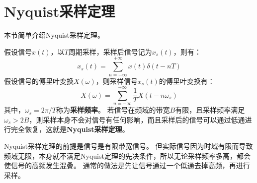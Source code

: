 \section{Nyquist采样定理}

本节简单介绍Nyquist采样定理。

假设信号$x\left( t \right) $，以$T$周期采样，采样后信号记为$x_s\left( t \right) $，则有：
\[
x_s\left( t \right) =\sum_{n=-\infty}^{+\infty}{x\left( t \right) \delta \left( t-nT \right)}
\]
假设信号的傅里叶变换$X\left( \omega \right) $，则采样信号$x_s\left( t \right) $的傅里叶变换有：
\[
X\left( \omega \right) =\sum_{n=-\infty}^{+\infty}{\frac{1}{T}X\left( t-n\omega _s \right)}
\]
其中，$\omega _s=2\pi /T$称为{\bf 采样频率}。
若信号在频域的带宽$B$有限，且采样频率满足$\omega _s>2B$，则采样本身不会对信号有任何影响，而且采样后的信号可以通过低通进行完全恢复，这就是{\bf Nyquist采样定理}。

Nyquist采样定理的前提是信号是有限带宽信号。
但实际信号因为时域有限而导致频域无限，本身就不满足Nyquist定理的先决条件，所以无论采样频率多高，都会使信号的高频发生混叠。
通常的做法是先让信号通过一个低通去掉高频，再进行采样。





